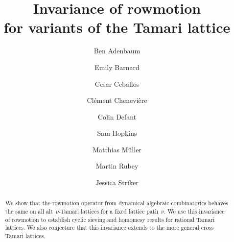 \documentclass[11pt]{amsart}
\theoremstyle{definition}
\begin{document}
\title[Invariance of rowmotion for variants of the Tamari lattice]{Invariance of rowmotion \\ for variants of the Tamari lattice} 

\author[Adenbaum]{Ben Adenbaum}
\address{}

\author[Barnard]{Emily Barnard}
\address{Department of Mathematical Sciences, DePaul University, Chicago, IL 60614, USA}

\author[Ceballos]{Cesar Ceballos}
\address{Institute of Geometry, TU Graz, Graz, Austria}

\author[Chenevi\`{e}re]{Cl\'{e}ment Chenevi\`{e}re}
\address{LIGM, Univ Gustave Eiffel, CNRS, ESIEE Paris, F-77454 Marne-la-Vall\'{e}e, France}

\author[Defant]{Colin Defant}
\address{Department of Mathematics, Harvard University, Cambridge, MA 02138, USA}

\author[Hopkins]{Sam Hopkins}
\address{Department of Mathematics, Howard University, Washington, DC 20059, USA}

\author[M\"{u}ller]{Matthias M\"{u}ller}
\address{Institute of Geometry, TU Graz, Graz, Austria}

\author[Rubey]{Martin Rubey}
\address{Institut f\"{u}r Diskrete Mathematik und Geometrie, TU Wien, Wien, Austria}

\author[Striker]{Jessica Striker}
\address{Department of Mathematics, North Dakota State University, Fargo, ND 58105, USA}

\begin{abstract}
We show that the rowmotion operator from dynamical algebraic combinatorics behaves the same on all alt~$\nu$-Tamari lattices for a fixed lattice path~$\nu$. We use this invariance of rowmotion to establish cyclic sieving and homomesy results for rational Tamari lattices. We also conjecture that this invariance extends to the more general cross Tamari lattices. 
\end{abstract} 


\maketitle
\end{document}
